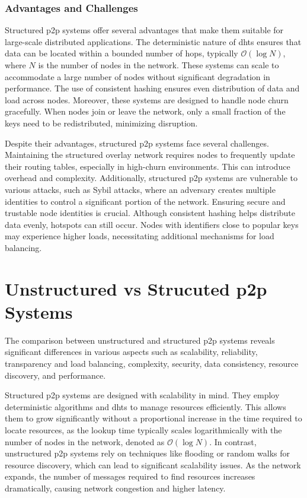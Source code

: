 \subsubsection*{Advantages and Challenges}
Structured \gls{p2p} systems offer several advantages that make them suitable for large-scale distributed applications.
The deterministic nature of \glspl{dht} ensures that data can be located within a bounded number of hops, typically $\mathcal{O}(\log N)$, where $N$ is the number of nodes in the network.
These systems can scale to accommodate a large number of nodes without significant degradation in performance.
The use of consistent hashing ensures even distribution of data and load across nodes.
Moreover, these systems are designed to handle node churn gracefully.
When nodes join or leave the network, only a small fraction of the keys need to be redistributed, minimizing disruption.

Despite their advantages, structured \gls{p2p} systems face several challenges.
Maintaining the structured overlay network requires nodes to frequently update their routing tables, especially in high-churn environments.
This can introduce overhead and complexity.
Additionally, structured \gls{p2p} systems are vulnerable to various attacks, such as Sybil attacks, where an adversary creates multiple identities to control a significant portion of the network.
Ensuring secure and trustable node identities is crucial.
Although consistent hashing helps distribute data evenly, hotspots can still occur.
Nodes with identifiers close to popular keys may experience higher loads, necessitating additional mechanisms for load balancing.

\section{Unstructured vs Strucuted \gls{p2p} Systems}
The comparison between unstructured and structured \gls{p2p} systems reveals significant differences in various aspects such as scalability, reliability, transparency and load balancing, complexity, security, data consistency, resource discovery, and performance.

Structured \gls{p2p} systems are designed with scalability in mind.
They employ deterministic algorithms and \glspl{dht} to manage resources efficiently.
This allows them to grow significantly without a proportional increase in the time required to locate resources, as the lookup time typically scales logarithmically with the number of nodes in the network, denoted as \(\mathcal{O}(\log N)\).
In contrast, unstructured \gls{p2p} systems rely on techniques like flooding or random walks for resource discovery, which can lead to significant scalability issues.
As the network expands, the number of messages required to find resources increases dramatically, causing network congestion and higher latency.

